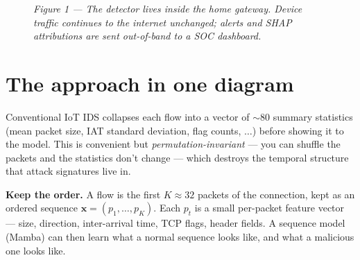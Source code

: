 \documentclass[11pt,a4paper]{article}
\begin{document}
\begin{figure}[H]
\caption*{\small\textit{Figure 1 --- The detector lives inside the home gateway. Device traffic continues to the internet unchanged; alerts and SHAP attributions are sent out-of-band to a SOC dashboard.}}
\end{figure}

\section{The approach in one diagram}

Conventional IoT IDS collapses each flow into a vector of $\sim$80 summary statistics (mean packet size, IAT standard deviation, flag counts, $\ldots$) before showing it to the model. This is convenient but \emph{permutation-invariant} --- you can shuffle the packets and the statistics don't change --- which destroys the temporal structure that attack signatures live in.

\begin{tcolorbox}[idea]
\textbf{Keep the order.} A flow is the first $K\!\approx\!32$ packets of the connection, kept as an ordered sequence $\mathbf{x} = (p_1, \ldots, p_K)$. Each $p_t$ is a small per-packet feature vector --- size, direction, inter-arrival time, TCP flags, header fields. A sequence model (Mamba) can then learn what a normal sequence looks like, and what a malicious one looks like.
\end{tcolorbox}
\end{document}
